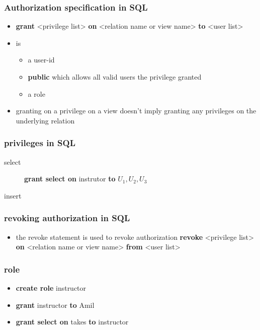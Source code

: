 \documentclass[11pt]{article}
\begin{document}
\subsubsection{Authorization specification in SQL}
\label{sec-8-5-1}
\begin{itemize}
\item \textbf{grant} <privilege list>
\textbf{on} <relation name or view name> \textbf{to} <user list>
\item <user list> is
\begin{itemize}
\item a user-id
\item \textbf{public} which allows all valid users the privilege granted
\item a role
\end{itemize}
\item granting on a privilege on a view doesn't imply granting any privileges on
the underlying relation
\end{itemize}
\subsubsection{privileges in SQL}
\label{sec-8-5-2}
\begin{description}
\item[{select}] \textbf{grant select on} instrutor \textbf{to} $U_1,U_2,U_3$
\item[{insert}] 
\end{description}
\subsubsection{revoking authorization in SQL}
\label{sec-8-5-3}
\begin{itemize}
\item the revoke statement is used to revoke authorization
\textbf{revoke} <privilege list>
\textbf{on} <relation name or view name> \textbf{from} <user list>
\end{itemize}
\subsubsection{role}
\label{sec-8-5-4}
\begin{itemize}
\item \textbf{create role} instructor
\item \textbf{grant} instructor \textbf{to} Amil
\item \textbf{grant select on} takes \textbf{to} instructor
\end{itemize}
\end{document}
